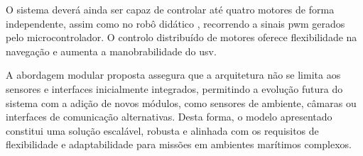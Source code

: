 
O sistema deverá ainda ser capaz de controlar até quatro motores de forma independente, assim como no robô didático \cite{didactic-robot-thesis}, recorrendo a sinais \gls{pwm} gerados pelo microcontrolador. O controlo distribuído de motores oferece flexibilidade na navegação e aumenta a manobrabilidade do \gls{usv}.

A abordagem modular proposta assegura que a arquitetura não se limita aos sensores e interfaces inicialmente integrados, permitindo a evolução futura do sistema com a adição de novos módulos, como sensores de ambiente, câmaras ou interfaces de comunicação alternativas. Desta forma, o modelo apresentado constitui uma solução escalável, robusta e alinhada com os requisitos de flexibilidade e adaptabilidade para missões em ambientes marítimos complexos.
